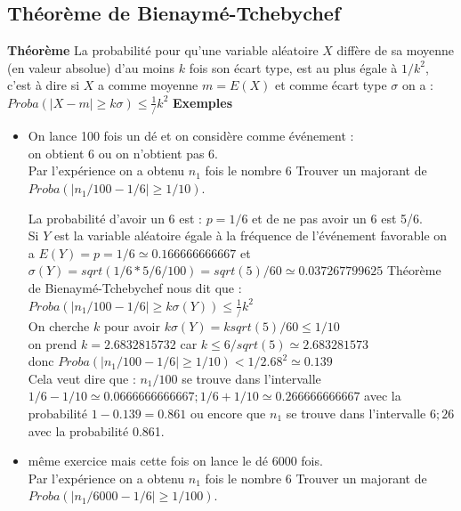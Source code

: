 \documentclass[a4paper,11pt]{book}
\begin{document}
\subsection{Th\'eor\`eme de Bienaym\'e-Tchebychef}
{\bf Th\'eor\`eme} La probabilit\'e pour qu'une variable al\'eatoire $X$ 
diff\`ere de sa moyenne (en valeur absolue) d'au moins $k$ fois son \'ecart 
type, est au plus \'egale \`a $1/k^2$, c'est \`a dire si $X$  a comme moyenne
$m=E(X)$ et comme \'ecart type $\sigma$ on a :
$Proba(|X-m| \geq k \sigma)\leq \frac{1}/{k^2}$
{\bf Exemples}
\begin{itemize}
\item On lance 100 fois un d\'e et on consid\`ere comme \'ev\'enement :\\
on obtient 6 ou on n'obtient pas 6.\\
Par l'exp\'erience on a obtenu $n_1$ fois le nombre 6
Trouver  un majorant de  $Proba(|n_1/100-1/6| \geq 1/10)$.

La probabilit\'e d'avoir un 6 est : $p=1/6$ et de ne pas avoir un 6 est 5/6.\\
Si $Y$ est la variable al\'eatoire \'egale \`a la fr\'equence de 
l'\'ev\'enement favorable on a $E(Y)=p=1/6 \simeq 0.166666666667$ et 
$\sigma(Y)=sqrt(1/6*5/6/100)=sqrt(5)/60 \simeq 0.037267799625$
Th\'eor\`eme de Bienaym\'e-Tchebychef nous dit que :\\
$Proba(|n_1/100-1/6| \geq k \sigma(Y))\leq \frac{1}/{k^2}$\\
On cherche $k$ pour avoir $k \sigma(Y)= k sqrt(5)/60\leq 1/10$\\
on prend $k=2.6832815732$ car $k\leq 6/sqrt(5)\simeq 2.683281573$\\
donc $Proba(|n_1/100-1/6| \geq 1/10)<1/2.68^2\simeq 0.139$\\
Cela veut dire que : $n_1/100$ se trouve dans l'intervalle \\
$1/6-1/10\simeq 0.0666666666667;1/6+1/10 \simeq 0.266666666667$ avec la 
probabilit\'e $1-0.139=0.861$ ou encore que $n_1$ se trouve dans l'intervalle
$6; 26$ avec la probabilit\'e 0.861.

\item m\^eme exercice mais cette fois on lance le d\'e 6000 fois.\\
Par l'exp\'erience on a obtenu $n_1$ fois le nombre 6
Trouver  un majorant de  $Proba(|n_1/6000-1/6| \geq 1/100)$.


\end{itemize}
\end{document}
